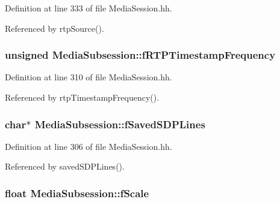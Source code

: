 Definition at line 333 of file Media\+Session.\+hh.



Referenced by rtp\+Source().

\subsubsection[{f\+R\+T\+P\+Timestamp\+Frequency}]{\setlength{\rightskip}{0pt plus 5cm}unsigned Media\+Subsession\+::f\+R\+T\+P\+Timestamp\+Frequency\hspace{0.3cm}{\ttfamily [protected]}}\label{classMediaSubsession_a62e20058212c41b2102fef55dd9097fa}


Definition at line 310 of file Media\+Session.\+hh.



Referenced by rtp\+Timestamp\+Frequency().

\subsubsection[{f\+Saved\+S\+D\+P\+Lines}]{\setlength{\rightskip}{0pt plus 5cm}char$\ast$ Media\+Subsession\+::f\+Saved\+S\+D\+P\+Lines\hspace{0.3cm}{\ttfamily [protected]}}\label{classMediaSubsession_a36042ff70c969c78073b2f950f495f93}


Definition at line 306 of file Media\+Session.\+hh.



Referenced by saved\+S\+D\+P\+Lines().

\subsubsection[{f\+Scale}]{\setlength{\rightskip}{0pt plus 5cm}float Media\+Subsession\+::f\+Scale\hspace{0.3cm}{\ttfamily [protected]}}\label{classMediaSubsession_a94ad7e2e9740998c7db66cf82cca1aff}


